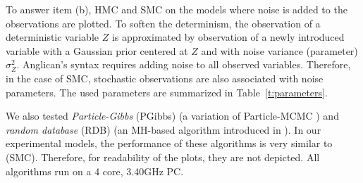 \documentclass[letterpaper]{article}
\begin{document}
To answer item (b), HMC and SMC on the models where noise is added to the observations are plotted. 
%
To soften the determinism, %
the observation of a deterministic variable $Z$ %
is approximated by observation of a newly introduced variable 
with a Gaussian prior centered at $Z$ and with noise variance (parameter) $\sigma^2_{Z}$. 
Anglican's syntax requires %
adding noise to all observed variables. Therefore, in the case of SMC, stochastic observations are also associated with noise parameters.
The used parameters are summarized in Table~\ref{t:parameters}.
%

We also tested \emph{Particle-Gibbs} (PGibbs) (a variation of Particle-MCMC \cite{andrieu2010particle}) 
and \emph{random database} (RDB) (an MH-based algorithm introduced in \cite{wingate2011lightweight}).
In our experimental models, the performance of these algorithms is very similar to (SMC). Therefore, for readability of the plots, they are not depicted. 
% 
All algorithms run on a 4 core, 3.40GHz PC.%
\end{document}
